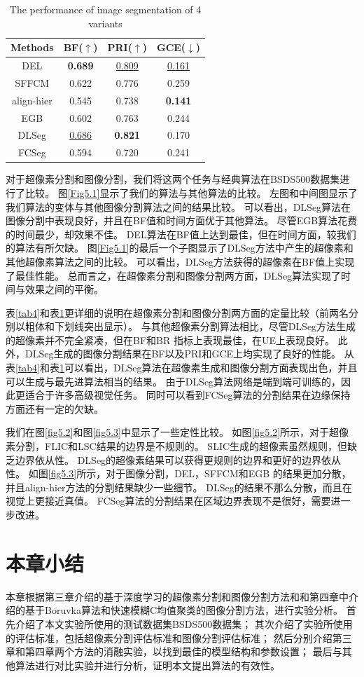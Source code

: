 \begin{table}[htbp]
\caption{The performance of image segmentation of 4 variants}
\label{tab5}
\vspace{0.5em}\centering\wuhao
\begin{tabular}{cccc}
\toprule[1.5pt]
Methods & BF($\uparrow$) & PRI($\uparrow$) & GCE($\downarrow$) \\
\midrule[1pt]
DEL        & \textbf{0.689}    & \underline{0.809}  & \underline{0.161}\\
SFFCM      & 0.622             & 0.776              & 0.259\\
align-hier & 0.545             & 0.738              & \textbf{0.141} \\
EGB        & 0.602             & 0.763              & 0.244\\
DLSeg   & \underline{0.686} & \textbf{0.821}     & 0.170 \\
FCSeg  & 0.594 & 0.720 & 0.241 \\
\bottomrule[1.5pt]
\end{tabular}
\vspace{\baselineskip}
\end{table}

对于超像素分割和图像分割，我们将这两个任务与经典算法在BSDS500数据集进行了比较。
图\ref{Fig5.1}显示了我们的算法与其他算法的比较。
左图和中间图显示了我们算法的变体与其他图像分割算法之间的结果比较。
可以看出，DLSeg算法在图像分割中表现良好，并且在BF值和时间方面优于其他算法。
尽管EGB算法花费的时间最少，却效果不佳。
DEL算法在BF值上达到最佳，但在时间方面，较我们的算法有所欠缺。
图\ref{Fig5.1}的最后一个子图显示了DLSeg方法中产生的超像素和其他超像素算法之间的比较。
可以看出，DLSeg方法获得的超像素在BF值上实现了最佳性能。
总而言之，在超像素分割和图像分割两方面，DLSeg算法实现了时间与效果之间的平衡。

表\ref{tab4}和表\ref{tab5}更详细的说明在超像素分割和图像分割两方面的定量比较（前两名分别以粗体和下划线突出显示）。
与其他超像素分割算法相比，尽管DLSeg方法生成的超像素并不完全紧凑，但在BF和BR 指标上表现最佳，在UE上表现良好。
此外，DLSeg生成的图像分割结果在BF以及PRI和GCE上均实现了良好的性能。
从表\ref{tab4}和表\ref{tab5}可以看出，DLSeg算法在超像素生成和图像分割方面表现出色，并且可以生成与最先进算法相当的结果。
由于DLSeg算法网络是端到端可训练的，因此更适合于许多高级视觉任务。
同时可以看到FCSeg算法的分割结果在边缘保持方面还有一定的欠缺。

我们在图\ref{fig5.2}和图\ref{fig5.3}中显示了一些定性比较。
如图\ref{fig5.2}所示，对于超像素分割，FLIC和LSC结果的边界是不规则的。
SLIC生成的超像素虽然规则，但缺乏边界依从性。
DLSeg的超像素结果可以获得更规则的边界和更好的边界依从性。
如图\ref{fig5.3}所示，对于图像分割，DEL，SFFCM和EGB 的结果更加分散，并且align-hier方法的分割结果缺少一些细节。
DLSeg的结果不那么分散，而且在视觉上更接近真值。
FCSeg算法的分割结果在区域边界表现不是很好，需要进一步改进。

\section{本章小结}

本章根据第三章介绍的基于深度学习的超像素分割和图像分割方法和和第四章中介绍的基于Boruvka算法和快速模糊C均值聚类的图像分割方法，进行实验分析。
首先介绍了本文实验所使用的测试数据集BSDS500数据集；
其次介绍了实验所使用的评估标准，包括超像素分割评估标准和图像分割评估标准；
然后分别介绍第三章和第四章两个方法的消融实验，以找到最佳的模型结构和参数设置；
最后与其他算法进行对比实验并进行分析，证明本文提出算法的有效性。
